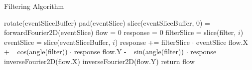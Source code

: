\begin{algorithm}
 \caption{Filtering Algorithm}
 \label{algo:optic}
 \begin{algorithmic}[1]
  \State rotate(eventSliceBuffer)
  \State pad(eventSlice)  
  \State slice(eventSliceBuffer, 0) = forwardFourier2D(eventSlice)
  \State flow = 0
  \State response = 0
  \State filterSlice = slice(filter, $i$)
  \State eventSlice = slice(eventSliceBuffer, $i$)
  \State response += filterSlice $\cdot$ eventSlice
  \EndFor
  \State flow.X += cos(angle(filter)) $\cdot$ response
  \State flow.Y -= sin(angle(filter)) $\cdot$ response
  \EndFor
  \State inverseFourier2D(flow.X)
  \State inverseFourier2D(flow.Y)
  \State return flow
  \EndProcedure
\end{algorithmic}

\end{algorithm}